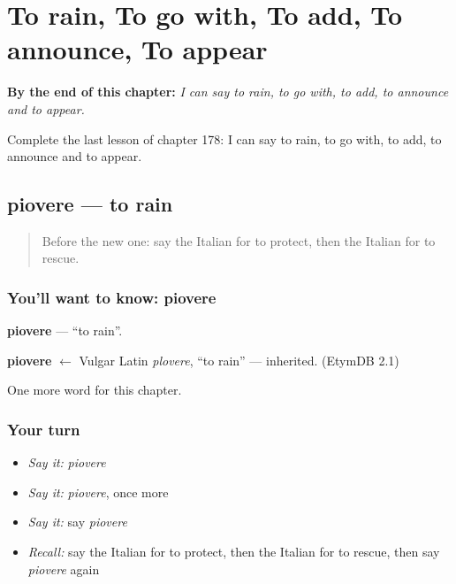 
\chapter{To rain, To go with, To add, To announce, To appear}
\label{ch:it-to-rain-to-go-with-to-add-to-announce-to-appear}

\begin{chapteropening}
\textbf{By the end of this chapter:} \emph{I can say to rain, to go with, to add, to announce and to appear.}

Complete the last lesson of chapter 178: I can say to rain, to go with, to add, to announce and to appear.
\end{chapteropening}

\section[piovere]{piovere — to rain}

\label{lesson:IT-C178-piovere}



\begin{quote}
Before the new one: say the Italian for to protect, then the Italian for to rescue.
\end{quote}

\subsection*{You'll want to know: piovere}
\textbf{piovere} — \textquotedblleft{}to rain\textquotedblright{}.

\begin{cousinweb}
\textbf{piovere} $\leftarrow$ Vulgar Latin \emph{plovere}, \textquotedblleft{}to rain\textquotedblright{} — inherited. (EtymDB 2.1)
\end{cousinweb}

\begin{grammarlens}[title={What you've built}]
One more word for this chapter.
\end{grammarlens}

\subsection*{Your turn}
\begin{itemize}
\raggedright
  \item \emph{Say it:} \emph{piovere}
  \item \emph{Say it:} \emph{piovere}, once more
  \item \emph{Say it:} say \emph{piovere}
  \item \emph{Recall:} say the Italian for to protect, then the Italian for to rescue, then say \emph{piovere} again
\end{itemize}

